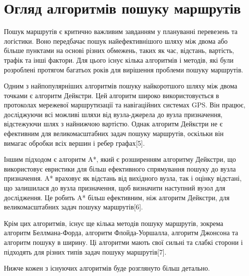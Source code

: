 \section{Огляд алгоритмів пошуку маршрутів}
\label{sec:route-search-algorithms}

Пошук маршрутів є критично важливим завданням у плануванні перевезень та логістики. Воно передбачає пошук найефективнішого шляху між двома або більше пунктами на основі різних обмежень, таких як час, відстань, вартість, трафік та інші фактори. Для цього існує кілька алгоритмів і методів, які були розроблені протягом багатьох років для вирішення проблеми пошуку маршрутів.

Одним з найпопулярніших алгоритмів пошуку найкоротшого шляху між двома точками є алгоритм Дейкстри. Цей алгоритм широко використовується в протоколах мережевої маршрутизації та навігаційних системах GPS. Він працює, досліджуючи всі можливі шляхи від вузла-джерела до вузла призначення, відстежуючи шлях з найнижчою вартістю. Однак алгоритм Дейкстри не є ефективним для великомасштабних задач пошуку маршрутів, оскільки він вимагає обробки всіх вершин і ребер графах[5].

Іншим підходом є алгоритм A*, який є розширенням алгоритму Дейкстри, що використовує евристики для більш ефективного спрямування пошуку до вузла призначення. A* враховує як відстань від вихідного вузла, так і оцінку відстані, що залишилася до вузла призначення, щоб визначити наступний вузол для дослідження. Це робить A* більш ефективним, ніж алгоритм Дейкстри, для великомасштабних задач пошуку маршрутів[6].

Крім цих алгоритмів, існує ще кілька методів пошуку маршрутів, зокрема алгоритм Беллмана-Форда, алгоритм Флойда-Уоршалла, алгоритм Джонсона та алгоритм пошуку в ширину. Ці алгоритми мають свої сильні та слабкі сторони і підходять для різних типів задач пошуку маршрутів[7].

Нижче кожен з існуючих алгоритмів буде розглянуто більш детально.












